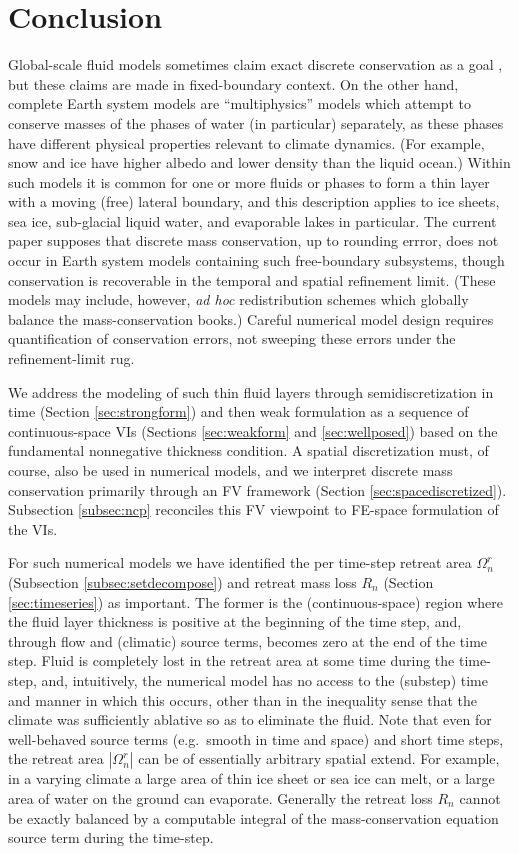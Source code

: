 \documentclass[final,onefignum]{siamart190516}
\begin{document}
\section{Conclusion} \label{sec:conclusion}

Global-scale fluid models sometimes claim exact discrete conservation as a goal \cite{Ringleretal2013,Thuburn2008}, but these claims are made in fixed-boundary context.  On the other hand, complete Earth system models are ``multiphysics'' models which attempt to conserve masses of the phases of water (in particular) separately, as these phases have different physical properties relevant to climate dynamics.  (For example, snow and ice have higher albedo and lower density than the liquid ocean.)  Within such models it is common for one or more fluids or phases to form a thin layer with a moving (free) lateral boundary, and this description applies to ice sheets, sea ice, sub-glacial liquid water, and evaporable lakes in particular.  The current paper supposes that discrete mass conservation, up to rounding errror, does not occur in Earth system models containing such free-boundary subsystems, though conservation is recoverable in the temporal and spatial refinement limit.  (These models may include, however, \emph{ad hoc} redistribution schemes which globally balance the mass-conservation books.)  Careful numerical model design requires quantification of conservation errors, not sweeping these errors under the refinement-limit rug.

We address the modeling of such thin fluid layers through semidiscretization in time (Section \ref{sec:strongform}) and then weak formulation as a sequence of continuous-space VIs (Sections \ref{sec:weakform} and \ref{sec:wellposed}) based on the fundamental nonnegative thickness condition.  A spatial discretization must, of course, also be used in numerical models, and we interpret discrete mass conservation primarily through an FV framework (Section \ref{sec:spacediscretized}).  Subsection \ref{subsec:ncp} reconciles this FV viewpoint to FE-space formulation of the VIs.

For such numerical models we have identified the per time-step retreat area $\Omega_n^r$ (Subsection \ref{subsec:setdecompose}) and retreat mass loss $R_n$ (Section \ref{sec:timeseries}) as important.  The former is the (continuous-space) region where the fluid layer thickness is positive at the beginning of the time step, and, through flow and (climatic) source terms, becomes zero at the end of the time step.  Fluid is completely lost in the retreat area at some time during the time-step, and, intuitively, the numerical model has no access to the (substep) time and manner in which this occurs, other than in the inequality sense that the climate was sufficiently ablative so as to eliminate the fluid.  Note that even for well-behaved source terms (e.g.~smooth in time and space) and short time steps, the retreat area $|\Omega_n^r|$ can be of essentially arbitrary spatial extend.  For example, in a varying climate a large area of thin ice sheet or sea ice can melt, or a large area of water on the ground can evaporate.  Generally the retreat loss $R_n$ cannot be exactly balanced by a computable integral of the mass-conservation equation source term during the time-step.
\end{document}
